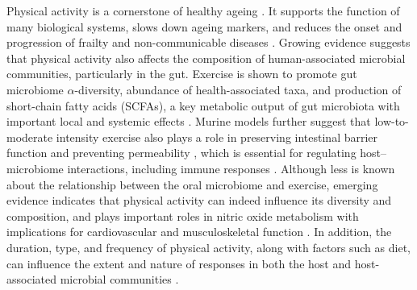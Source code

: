 \documentclass[preprint,12pt,authoryear]{elsarticle}
\begin{document}
   Physical activity is a cornerstone of healthy ageing \citep{mcpheePhysicalActivityOlder2016, pahorEffectStructuredPhysical2014, rodriguez-manasEffectivenessMultimodalIntervention2019}. It supports the function of many biological systems, slows down ageing markers, and reduces the onset and progression of frailty and non-communicable diseases \citep{garatacheaExerciseAttenuatesMajor2015, prommabanEffectExerciseProgram2024, rogersPhysicalActivityTrajectories2017}. Growing evidence suggests that physical activity also affects the composition of human-associated microbial communities, particularly in the gut. Exercise is shown to promote gut microbiome $\alpha$-diversity, abundance of health-associated taxa, and production of short-chain fatty acids (SCFAs), a key metabolic output of gut microbiota with important local and systemic effects \citep{lambertExerciseTrainingModifies2015, khalediAssociationExerciseChanges2024, koblinskyRoleGutMicrobiome2023, shinExerciseGutMicrobiome2019}. Murine models further suggest that low-to-moderate intensity exercise also plays a role in preserving intestinal barrier function and preventing permeability \citep{luoEffectsModerateExercise2014, wangModerateTreadmillExercise2022, yuExerciseProtectsIntestinal2022}, which is essential for regulating host–microbiome interactions, including immune responses \citep{dmytrivIntestinalBarrierPermeability2024}. Although less is known about the relationship between the oral microbiome and exercise, emerging evidence indicates that physical activity can indeed influence its diversity and composition, and plays important roles in nitric oxide metabolism with implications for cardiovascular and musculoskeletal function \citep{uchidaEffectsExerciseOral2021, simpsonEightWeeksHighintensity2025, cutlerPostexerciseHypotensionSkeletal2019}. In addition, the duration, type, and frequency of physical activity, along with factors such as diet, can influence the extent and nature of responses in both the host and host-associated microbial communities \citep{bermonMicrobiotaExerciseImmunology2015, bycuraImpactDifferentExercise2021, cataldiRelationshipPhysicalActivity2022}.
\end{document}
